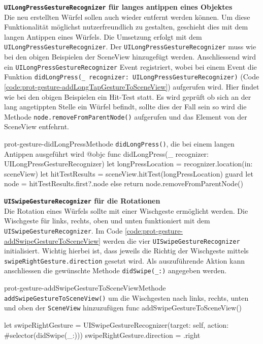 \begin{description}
    \textbf{\texttt{UILongPressGestureRecognizer} für langes antippen eines Objektes}\\
    Die neu erstellten Würfel sollen auch wieder entfernt werden können. Um diese Funktionalität möglichst nutzerfreundlich zu gestalten, geschieht dies mit dem langen Antippen eines Würfels. Die Umsetzung erfolgt mit dem \texttt{UILongPressGestureRecognizer}. Der \texttt{UILongPressGestureRecognizer} muss wie bei den obigen Beispielen der SceneView hinzugefügt werden. Anschliessend wird ein \texttt{UILongPressGestureRecognizer} Event registriert, wobei bei einem Event die Funktion \texttt{didLongPress(\_ recognizer: UILongPressGestureRecognizer)} (Code \ref{code:prot-gesture-addLongTapGestureToSceneView}) aufgerufen wird. Hier findet wie bei den obigen Beispielen ein Hit-Test statt. Es wird geprüft ob sich an der lang angetippten Stelle ein Würfel befindt, sollte dies der Fall sein so wird die Methode \texttt{node.removeFromParentNode()} aufgerufen und das Element von der SceneView entfehrnt.

    \begin{code}{prot-gesture-didLongPress}{Methode \texttt{didLongPress()}, die bei einem langen Antippen ausgeführt wird}
    @objc
    func didLongPress(\_ recognizer: UILongPressGestureRecognizer) {
        let longPressLocation = recognizer.location(in: sceneView)
        let hitTestResults = sceneView.hitTest(longPressLocation)
        guard let node = hitTestResults.first?.node else { return }
        node.removeFromParentNode()
    }
    \end{code}
    
    \textbf{\texttt{UISwipeGestureRecognizer} für die Rotationen}\\
    Die Rotation eines Würfels sollte mit einer Wischgeste ermöglicht werden. Die Wischgeste für links, rechts, oben und unten funktioniert mit dem \texttt{UISwipeGestureRecognizer}. Im Code \ref{code:prot-gesture-addSwipeGestureToSceneView} werden die vier \texttt{UISwipeGestureRecognizer} initialisiert. Wichtig hierbei ist, dass jeweils die Richtig der Wischgeste mittels \texttt{swipeRightGesture.direction} gesetzt wird. Als auszuführende Aktion kann anschliessen die gewünschte Methode \texttt{didSwipe(\_:)} angegeben werden.

    \begin{code}{prot-gesture-addSwipeGestureToSceneView}{Methode \texttt{addSwipeGestureToSceneView()} um die Wischgesten nach links, rechts, unten und oben der \texttt{SceneView} hinzuzufügen}
        func addSwipeGestureToSceneView() {
            let swipeRightGesture = UISwipeGestureRecognizer(target: self, action: #selector(didSwipe(_:)))
            swipeRightGesture.direction = .right
            
}
\end{code}
\end{description}
